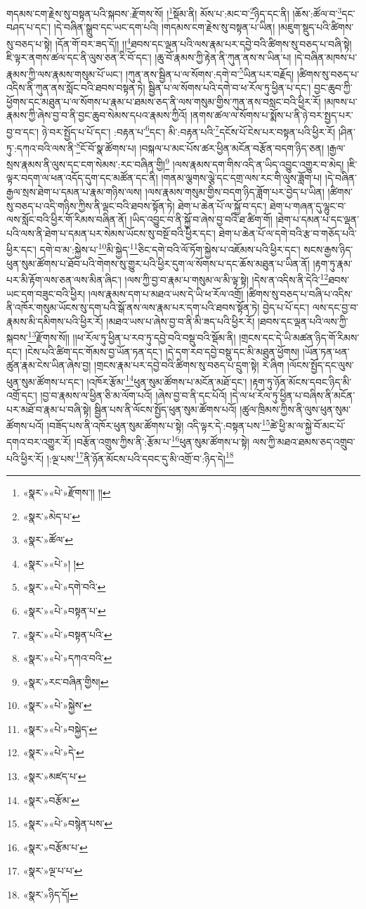 གདམས་ངག་རྗེས་སུ་བསྟན་པའི་སྐབས་:རྫོགས་སོ། །\footnote{«སྣར་»«པེ་»རྫོགས་།། །།}སྡོམ་ནི། མོས་པ་:མང་བ་\footnote{«སྣར་»མེད་པ་}ཉིད་དང་ནི། །ཆོས་:ཚོལ་བ་\footnote{«སྣར་»ཚོལ་}དང་བཤད་པ་དང་། །དེ་བཞིན་སྒྲུབ་དང་ཡང་དག་པའི། །གདམས་ངག་རྗེས་སུ་བསྟན་པ་ཡིན། །མཇུག་སྡུད་པའི་ཚིགས་སུ་བཅད་པ་སྟེ། །དོན་གོ་བར་ཟད་དོ།། །།\footnote{«སྣར་»«པེ་»། །}ཐབས་དང་ལྡན་པའི་ལས་རྣམ་པར་དབྱེ་བའི་ཚིགས་སུ་བཅད་པ་བཞི་སྟེ། ཇི་ལྟར་ནགས་ཚལ་དང་ནི་ལུས་ཅན་རི་བོ་དང་། །ཆུ་བོ་རྣམས་ཀྱི་རྟེན་ནི་ཀུན་ནས་ས་ཡིན་པ། །དེ་བཞིན་མཁས་པ་རྣམས་ཀྱི་ལས་རྣམས་གསུམ་པོ་ཡང་། །ཀུན་ནས་སྦྱིན་པ་ལ་སོགས་:དགེ་བ་\footnote{«སྣར་»«པེ་»དགེ་བའི་}ཡིན་པར་བརྗོད། །ཚིགས་སུ་བཅད་པ་འདིས་ནི་ཀུན་ནས་སློང་བའི་ཐབས་བསྟན་ཏེ། སྦྱིན་པ་ལ་སོགས་པའི་དགེ་བ་ཕ་རོལ་ཏུ་ཕྱིན་པ་དང་། བྱང་ཆུབ་ཀྱི་ཕྱོགས་དང་མཐུན་པ་ལ་སོགས་པ་རྣམ་པ་ཐམས་ཅད་ནི་ལས་གསུམ་གྱིས་ཀུན་ནས་བསླང་བའི་ཕྱིར་རོ། །མཁས་པ་རྣམས་ཀྱི་ཞེས་བྱ་བ་ནི་བྱང་ཆུབ་སེམས་དཔའ་རྣམས་ཀྱིའོ། །ནགས་ཚལ་ལ་སོགས་པ་སྨོས་པ་ནི་ཉེ་བར་སྤྱད་པར་བྱ་བ་དང་། ཉེ་བར་སྤྱོད་པ་པོ་དང་། :བརྟན་པ་\footnote{«སྣར་»«པེ་»བསྟན་པ་}དང་། མི་:བརྟན་པའི་\footnote{«སྣར་»«པེ་»བསྟན་པའི་}དངོས་པོ་ངེས་པར་བསྟན་པའི་ཕྱིར་རོ། །ཤིན་ཏུ་:དཀའ་བའི་ལས་ནི་\footnote{«སྣར་»«པེ་»དཀའ་བའི་}ངོ་བོ་སྣ་ཚོགས་པ། །བསྐལ་པ་མང་པོས་ཚར་ཕྱིན་མངོན་བརྩོན་བདག་ཉིད་ཅན། །རྒྱལ་སྲས་རྣམས་ནི་ལུས་དང་ངག་སེམས་:རང་བཞིན་གྱི།\footnote{«སྣར་»རང་བཞིན་གྱིས།} །ལས་རྣམས་དག་གིས་འདི་ན་ཡིད་འབྱུང་འགྱུར་བ་མེད། །ཇི་ལྟར་བདག་ལ་ཕན་འདོད་དུག་དང་མཚོན་དང་ནི། །གནམ་ལྕགས་ལྕེ་དང་དགྲ་ལས་རང་གི་ལུས་ཟློག་པ། །དེ་བཞིན་རྒྱལ་སྲས་ཐེག་པ་དམན་པ་རྣམ་གཉིས་ལས། །ལས་རྣམས་གསུམ་གྱིས་བདག་ཉིད་ཟློག་པར་བྱེད་པ་ཡིན། །ཚིགས་སུ་བཅད་པ་འདི་གཉིས་ཀྱིས་ནི་ལྡང་བའི་ཐབས་སྟོན་ཏེ། ཐེག་པ་ཆེན་པོ་ལ་སྐྱོ་བ་དང་། ཐེག་པ་གཞན་དུ་ལྷུང་བ་ལས་སློང་བའི་ཕྱིར་གོ་རིམས་བཞིན་ནོ། །ཡིད་འབྱུང་བ་ནི་སྐྱོ་བ་ཞེས་བྱ་བའི་ཐ་ཚིག་གོ། །ཐེག་པ་དམན་པ་དང་ལྡན་པའི་ལས་ནི་ཐེག་པ་དམན་པར་སེམས་ཡོངས་སུ་བསྔོ་བའི་ཕྱིར་དང་། ཐེག་པ་ཆེན་པོ་ལ་དགེ་བའི་རྩ་བ་གཅོད་པའི་ཕྱིར་དང་། དགེ་བ་མ་:སྐྱེས་པ་\footnote{«སྣར་»«པེ་»སྐྱེས་}མི་སྐྱེད་\footnote{«སྣར་»«པེ་»བསྐྱེད་}ཅིང་དགེ་བའི་ལོ་ཏོག་སྐྱེས་པ་འཇོམས་པའི་ཕྱིར་དང་། སངས་རྒྱས་ཉིད་ཕུན་སུམ་ཚོགས་པ་ཐོབ་པའི་གེགས་སུ་གྱུར་པའི་ཕྱིར་དུག་ལ་སོགས་པ་དང་ཆོས་མཐུན་པ་ཡིན་ནོ། །རྟག་ཏུ་རྣམ་པར་མི་རྟོག་ལས་ཅན་ལས་མིན་ཞིང་། །ལས་ཀྱི་བྱ་བ་རྣམ་པ་གསུམ་ལ་མི་ལྟ་སྟེ། །དེས་ན་འདིས་ནི་དེའི་\footnote{«སྣར་»«པེ་»དེ་}ཐབས་ཡང་དག་བཟུང་བའི་ཕྱིར། །ལས་རྣམས་དག་པ་མཐའ་ཡས་དེ་ཡི་ཕ་རོལ་འགྲོ། །ཚིགས་སུ་བཅད་པ་བཞི་པ་འདིས་ནི་འཁོར་གསུམ་ཡོངས་སུ་དག་པའི་སྒོ་ནས་ལས་རྣམ་པར་དག་པའི་ཐབས་སྟོན་ཏེ། བྱེད་པ་པོ་དང་། ལས་དང་བྱ་བ་རྣམས་མི་དམིགས་པའི་ཕྱིར་རོ། །མཐའ་ཡས་པ་ཞེས་བྱ་བ་ནི་མི་ཟད་པའི་ཕྱིར་རོ། །ཐབས་དང་ལྡན་པའི་ལས་ཀྱི་སྐབས་\footnote{«སྣར་»མཛད་པ་}རྫོགས་སོ།། །།ཕ་རོལ་ཏུ་ཕྱིན་པ་རབ་ཏུ་དབྱེ་བའི་བསྡུ་བའི་སྡོམ་ནི། །གྲངས་དང་དེ་ཡི་མཚན་ཉིད་གོ་རིམས་དང་། །ངེས་པའི་ཚིག་དང་གོམས་བྱ་ཡོན་ཏན་དང་། །དེ་དག་རབ་དབྱེ་བསྡུ་དང་མི་མཐུན་ཕྱོགས། །ཡོན་ཏན་ཕན་ཚུན་རྣམ་ངེས་ཡིན་ཞེས་བྱ། །གྲངས་རྣམ་པར་དབྱེ་བའི་ཚིགས་སུ་བཅད་པ་དྲུག་སྟེ། རེ་ཞིག །ལོངས་སྤྱོད་དང་ལུས་ཕུན་སུམ་ཚོགས་པ་དང་། །འཁོར་རྩོམ་\footnote{«སྣར་»བརྩོམ་}ཕུན་སུམ་ཚོགས་པ་མངོན་མཐོ་དང་། །རྟག་ཏུ་ཉོན་མོངས་དབང་ཉིད་མི་འགྲོ་དང་། །བྱ་བ་རྣམས་ལ་ཕྱིན་ཅི་མ་ལོག་པའོ། །ཞེས་བྱ་བ་ནི་དང་པོའོ། །དེ་ལ་ཕ་རོལ་ཏུ་ཕྱིན་པ་བཞིས་ནི་མངོན་པར་མཐོ་བ་རྣམ་པ་བཞི་སྟེ། སྦྱིན་པས་ནི་ལོངས་སྤྱོད་ཕུན་སུམ་ཚོགས་པའོ། །ཚུལ་ཁྲིམས་ཀྱིས་ནི་ལུས་ཕུན་སུམ་ཚོགས་པའོ། །བཟོད་པས་ནི་འཁོར་ཕུན་སུམ་ཚོགས་པ་སྟེ། འདི་ལྟར་དེ་:བསྟན་པས་\footnote{«སྣར་»«པེ་»བསྙེན་པས་}ཚེ་ཕྱི་མ་ལ་སྐྱེ་བོ་མང་པོ་དགའ་བར་འགྱུར་རོ། །བརྩོན་འགྲུས་ཀྱིས་ནི་:རྩོམ་པ་\footnote{«སྣར་»བརྩོམ་པ་}ཕུན་སུམ་ཚོགས་པ་སྟེ། ལས་ཀྱི་མཐའ་ཐམས་ཅད་འགྲུབ་པའི་ཕྱིར་རོ། །:ལྔ་པས་\footnote{«སྣར་»ལྔ་པ་པ་}ནི་ཉོན་མོངས་པའི་དབང་དུ་མི་འགྲོ་བ་:ཉིད་དེ།\footnote{«སྣར་»ཉིད་དོ།} 